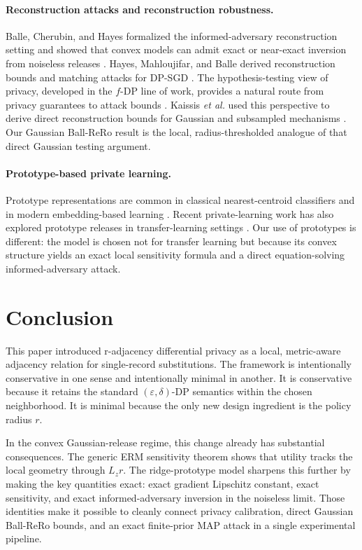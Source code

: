 \documentclass[conference,compsoc]{IEEEtran}
\begin{document}
\paragraph{Reconstruction attacks and reconstruction robustness.}
Balle, Cherubin, and Hayes formalized the informed-adversary reconstruction setting and showed that convex models can admit exact or near-exact inversion from noiseless releases \cite{balle2022informed}. Hayes, Mahloujifar, and Balle derived reconstruction bounds and matching attacks for DP-SGD \cite{hayes2023bounding}. The hypothesis-testing view of privacy, developed in the $f$-DP line of work, provides a natural route from privacy guarantees to attack bounds \cite{dong2022fdp}. Kaissis \emph{et al.} used this perspective to derive direct reconstruction bounds for Gaussian and subsampled mechanisms \cite{kaissis2023rero}. Our Gaussian Ball-ReRo result is the local, radius-thresholded analogue of that direct Gaussian testing argument.

\paragraph{Prototype-based private learning.}
Prototype representations are common in classical nearest-centroid classifiers and in modern embedding-based learning \cite{snell2017prototypical}. Recent private-learning work has also explored prototype releases in transfer-learning settings \cite{wahdany2025dppl}. Our use of prototypes is different: the model is chosen not for transfer learning but because its convex structure yields an exact local sensitivity formula and a direct equation-solving informed-adversary attack.

\section{Conclusion}
\label{sec:conclusion}

This paper introduced r-adjacency differential privacy as a local, metric-aware adjacency relation for single-record substitutions. The framework is intentionally conservative in one sense and intentionally minimal in another. It is conservative because it retains the standard $(\varepsilon,\delta)$-DP semantics within the chosen neighborhood. It is minimal because the only new design ingredient is the policy radius $r$.

In the convex Gaussian-release regime, this change already has substantial consequences. The generic ERM sensitivity theorem shows that utility tracks the local geometry through $L_z r$. The ridge-prototype model sharpens this further by making the key quantities exact: exact gradient Lipschitz constant, exact sensitivity, and exact informed-adversary inversion in the noiseless limit. Those identities make it possible to cleanly connect privacy calibration, direct Gaussian Ball-ReRo bounds, and an exact finite-prior MAP attack in a single experimental pipeline.
\end{document}
